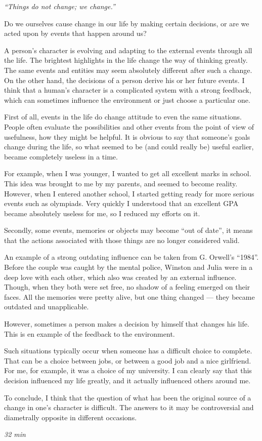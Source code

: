 \documentclass[12pt,a4paper]{article}
\begin{document}
\textit{``Things do not change; we change.''}

Do we ourselves cause change in our life by making certain decisions, or are we acted upon by events that happen around us?

\vspace{3mm}
\hline
\vspace{5mm}

A person's character is evolving and adapting to the external events through all the life. The brightest highlights in the life change the way of thinking greatly. The same events and entities may seem absolutely different after such a change. On the other hand, the decisions of a person derive his or her future events. I think that a human's character is a complicated system with a strong feedback, which can sometimes influence the environment or just choose a particular one.

First of all, events in the life do change attitude to even the same situations. People often evaluate the possibilities and other events from the point of view of usefulness, how they might be helpful. It is obvious to say that someone's goals change during the life, so what seemed to be (and could really be) useful earlier, became completely useless in a time.

For example, when I was younger, I wanted to get all excellent marks in school. This idea was brought to me by my parents, and seemed to become reality. However, when I entered another school, I started getting ready for more serious events such as olympiads. Very quickly I understood that an excellent GPA became absolutely useless for me, so I reduced my efforts on it.

Secondly, some events, memories or objects may become ``out of date'', it means that the actions associated with those things are no longer considered valid.

An example of a strong outdating influence can be taken from G. Orwell's ``1984''. Before the couple was caught by the mental police, Winston and Julia were in a deep love with each other, which also was created by an external influence. Though, when they both were set free, no shadow of a feeling emerged on their faces. All the memories were pretty alive, but one thing changed --- they became outdated and unapplicable.

However, sometimes a person makes a decision by himself that changes his life. This is en example of the feedback to the environment.

Such situations typically occur when someone has a difficult choice to complete. That can be a choice between jobs, or between a good job and a nice girlfriend. For me, for example, it was a choice of my university. I can clearly say that this decision influenced my life greatly, and it actually influenced others around me.

To conclude, I think that the question of what has been the original source of a change in one's character is difficult. The answers to it may be controversial and diametrally opposite in different occasions.

\textit{32 min}
\end{document}
